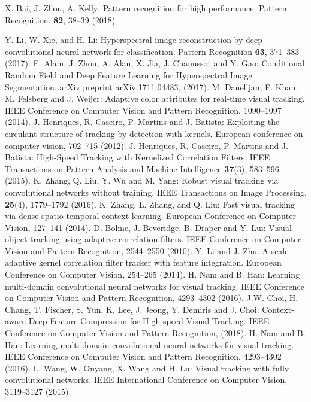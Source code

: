 \documentclass[runningheads,a4paper]{llncs}
\begin{document}
\begin{thebibliography}{8}
X. Bai, J. Zhou, A. Kelly: Pattern recognition for high performance. Pattern Recognition. \textbf{82}, 38--39 (2018)

Y. Li, W. Xie, and H. Li: Hyperspectral image reconstruction by deep convolutional neural network for classification. Pattern Recognition \textbf{63}, 371--383 (2017).
F. Alam, J. Zhou, A. Alan, X. Jia, J. Chanussot and Y. Gao: Conditional Random Field and Deep Feature Learning for Hyperspectral Image Segmentation. arXiv preprint arXiv:1711.04483, (2017).
M. Danelljan, F. Khan, M. Felsberg and J. Weijer: Adaptive color attributes for real-time visual tracking. IEEE Conference on Computer Vision and Pattern Recognition, 1090--1097 (2014).
J. Henriques, R. Caseiro, P. Martins and J. Batista: Exploiting the circulant structure of tracking-by-detection with kernels. European conference on computer vision, 702--715 (2012).
J. Henriques, R. Caseiro, P. Martins and J. Batista: High-Speed Tracking with Kernelized Correlation Filters. IEEE Transactions on Pattern Analysis and Machine Intelligence \textbf{37}(3), 583--596 (2015).
K. Zhang, Q. Liu, Y. Wu and M. Yang: Robust visual tracking via convolutional networks without training. IEEE Transactions on Image Processing, \textbf{25}(4), 1779--1792 (2016).
K. Zhang, L. Zhang, and Q. Liu: Fast visual tracking via dense spatio-temporal context learning. European Conference on Computer Vision, 127--141 (2014).
D. Bolme, J. Beveridge, B. Draper and Y. Lui: Visual object tracking using adaptive correlation filters. IEEE Conference on Computer Vision and Pattern Recognition, 2544--2550 (2010).
Y. Li and J. Zhu: A scale adaptive kernel correlation filter tracker with feature integration. European Conference on Computer Vision, 254--265 (2014).
H. Nam and B. Han: Learning multi-domain convolutional neural networks for visual tracking. IEEE Conference on Computer Vision and Pattern Recognition, 4293--4302 (2016).
J.W. Choi, H. Chang, T. Fischer, S. Yun, K. Lee, J. Jeong, Y. Demiris and J. Choi: Context-aware Deep Feature Compression for High-speed Visual Tracking. IEEE Conference on Computer Vision and Pattern Recognition, (2018).
H. Nam and B. Han: Learning multi-domain convolutional neural networks for visual tracking. IEEE Conference on Computer Vision and Pattern Recognition, 4293--4302 (2016).
L. Wang, W. Ouyang, X. Wang and H. Lu: Visual tracking with fully convolutional networks. IEEE International Conference on Computer Vision, 3119--3127 (2015).

\end{thebibliography}
\end{document}
